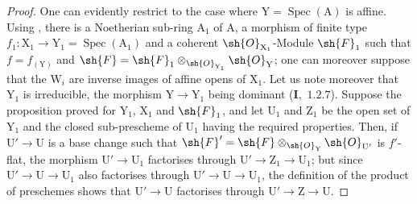 \begin{proof}
One can evidently restrict to the case where $\mathrm{Y}=\operatorname{Spec}(\mathrm{A})$ is affine. Using
, there is a Noetherian sub-ring $\mathrm{A}_1$ of $\mathrm{A}$, a morphism of finite type
$f_1:\mathrm{X}_1\to\mathrm{Y}_1=\operatorname{Spec}(\mathrm{A}_1)$ and a coherent $\sh{O}_{\mathrm{X}_1}$-Module $\sh{F}_1$ such that $f=f_{(\mathrm{Y})}$ and $\sh{F}=\sh{F}_1\otimes_{\sh{O}_{\mathrm{Y}_1}}\sh{O}_\mathrm{Y}$;
one can moreover suppose that the $\mathrm{W}_i$ are inverse images of affine opens of $\mathrm{X}_1$.
Let us note moreover that $\mathrm{Y}_1$ is irreducible, the morphism $\mathrm{Y}\to\mathrm{Y}_1$ being dominant (\textbf{I},~$1.2.7$).
Suppose the proposition proved for $\mathrm{Y}_1$, $\mathrm{X}_1$ and $\sh{F}_1$, and let $\mathrm{U}_1$ and $\mathrm{Z}_1$ be the open set of $\mathrm{Y}_1$
and the closed sub-prescheme of $\mathrm{U}_1$ having the required properties. Then, if $\mathrm{U}'\to\mathrm{U}$ is a base change
such that $\sh{F}'=\sh{F}\otimes_{\sh{O}_\mathrm{Y}}\sh{O}_{\mathrm{U}'}$ is $f'$-flat, the morphism $\mathrm{U}'\to\mathrm{U}_1$ factorises
through $\mathrm{U}'\to\mathrm{Z}_1\to\mathrm{U}_1$; but since $\mathrm{U}'\to\mathrm{U}\to\mathrm{U}_1$ also factorises through $\mathrm{U}'\to\mathrm{U}\to\mathrm{U}_1$, the definition
of the product of preschemes shows that $\mathrm{U}'\to\mathrm{U}$ factorises through $\mathrm{U}'\to\mathrm{Z}\to\mathrm{U}$.


\end{proof}
